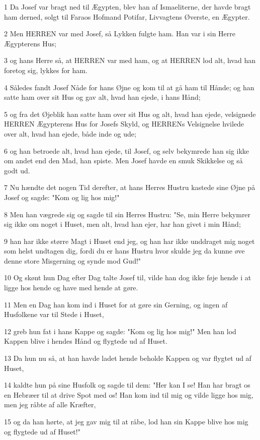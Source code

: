 \par 1 Da Josef var bragt ned til Ægypten, blev han af Ismaeliterne, der havde bragt ham derned, solgt til Faraos Hofmand Potifar, Livvagtens Øverste, en Ægypter.
\par 2 Men HERREN var med Josef, så Lykken fulgte ham. Han var i sin Herre Ægypterens Hus;
\par 3 og hans Herre så, at HERREN var med ham, og at HERREN lod alt, hvad han foretog sig, lykkes for ham.
\par 4 Således fandt Josef Nåde for hans Øjne og kom til at gå ham til Hånde; og han satte ham over sit Hus og gav alt, hvad han ejede, i hans Hånd;
\par 5 og fra det Øjeblik han satte ham over sit Hus og alt, hvad han ejede, velsignede HERREN Ægypterens Hus for Josefs Skyld, og HERRENs Velsignelse hvilede over alt, hvad han ejede, både inde og ude;
\par 6 og han betroede alt, hvad han ejede, til Josef, og selv bekymrede han sig ikke om andet end den Mad, han spiste. Men Josef havde en smuk Skikkelse og så godt ud.
\par 7 Nu hændte det nogen Tid derefter, at hans Herres Hustru kastede sine Øjne på Josef og sagde: "Kom og lig hos mig!"
\par 8 Men han vægrede sig og sagde til sin Herres Hustru: "Se, min Herre bekymrer sig ikke om noget i Huset, men alt, hvad han ejer, har han givet i min Hånd;
\par 9 han har ikke større Magt i Huset end jeg, og han har ikke unddraget mig noget som helst undtagen dig, fordi du er hans Hustru hvor skulde jeg da kunne øve denne store Misgerning og synde mod Gud!"
\par 10 Og skønt hun Dag efter Dag talte Josef til, vilde han dog ikke føje hende i at ligge hos hende og have med hende at gøre.
\par 11 Men en Dag han kom ind i Huset for at gøre sin Gerning, og ingen af Husfolkene var til Stede i Huset,
\par 12 greb hun fat i hans Kappe og sagde: "Kom og lig hos mig!" Men han lod Kappen blive i hendes Hånd og flygtede ud af Huset.
\par 13 Da hun nu så, at han havde ladet hende beholde Kappen og var flygtet ud af Huset,
\par 14 kaldte hun på sine Husfolk og sagde til dem: "Her kan I se! Han har bragt os en Hebræer til at drive Spot med os! Han kom ind til mig og vilde ligge hos mig, men jeg råbte af alle Kræfter,
\par 15 og da han hørte, at jeg gav mig til at råbe, lod han sin Kappe blive hos mig og flygtede ud af Huset!"

